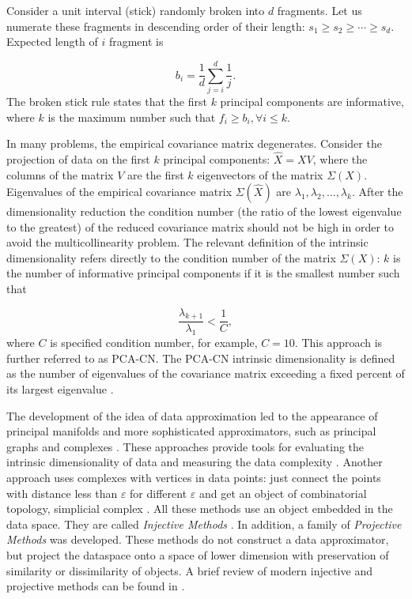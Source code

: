 \documentclass[entropy,article,submit,moreauthors,pdftex]{Definitions/mdpi}
\begin{document}
Consider a unit interval (stick) randomly broken into $d$ fragments. Let us numerate these fragments in descending order of their length: $s_1\ge s_2\ge\cdots\ge s_d$. Expected length of $i$ fragment is \cite{jackson1993stopping}

\begin{equation}\label{eq.BS}
b_i=\frac{1}{d}\sum_{j=i}^{d}\frac{1}{j}.
\end{equation}
The broken stick rule states that the first $k$ principal components are informative, where $k$ is the maximum number such that $f_i\ge b_i, \forall i\le k$.

In many problems, the empirical covariance matrix degenerates. Consider the projection of data on the first $k$ principal components: $\hat{X}=XV$, where the columns of the matrix $V$ are the first $k$ eigenvectors of the matrix $\Sigma(X)$. Eigenvalues of the empirical covariance matrix $\Sigma(\hat{X})$ are $\lambda_1,\lambda_2,\ldots,\lambda_k$. After the dimensionality reduction the condition number (the ratio of the lowest eigenvalue to the greatest) \cite{belsley2005regression} of the reduced covariance matrix should not be high in order to avoid the multicollinearity problem. The relevant definition \cite{gorban2018correction} of the intrinsic dimensionality refers directly to the condition number of the matrix $\Sigma(X)$: $k$ is the number of informative principal components if it is the smallest number such that

\begin{equation}\label{eq.CN}
\frac{\lambda_{k+1}}{\lambda_1}<\frac{1}{C},
\end{equation}
where $C$ is specified condition number, for example, $C=10$.  This approach is further referred to as PCA-CN. The PCA-CN intrinsic dimensionality is defined as the number of eigenvalues of the covariance matrix exceeding a fixed percent of its largest eigenvalue \cite{Fukunaga1971}.

The development of the idea of data approximation led to the appearance of principal manifolds \cite{gorban2008principal} and more sophisticated approximators, such as principal graphs and complexes \cite{gorban2007topological, gorban2010principal}. These approaches provide tools for evaluating the intrinsic dimensionality of data and measuring the data complexity \cite{zinovyev2013data}. Another approach uses complexes with vertices in data points: just connect the points with distance less than $\varepsilon$ for different $\varepsilon$ and get an object of combinatorial topology, simplicial complex \cite{Carlsson2009topology}. All these methods use an object embedded in the data space. They are called \emph{Injective Methods} \cite{bac2020lizard}. In addition, a family of \emph{Projective Methods} was developed. These methods do not construct a data approximator, but project the dataspace onto a space of lower dimension with preservation of similarity or dissimilarity of objects. A brief review of modern injective and projective methods can be found in \cite{bac2020lizard}.
\end{document}
